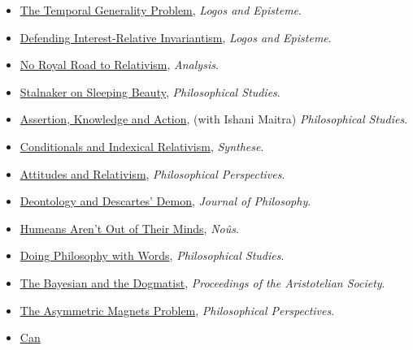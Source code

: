 \documentclass[
  10pt,
  letterpaper,
  DIV=11,
  numbers=noendperiod,
  twoside]{scrartcl}
\begin{document}
\begin{itemize}
{  and Supposition}, \emph{The Reasoner}.
\item
  \href{https://brian.weatherson.org/quarto/posts/tgp/the-temporal-generality-problem.html}{The
  Temporal Generality Problem}, \emph{Logos and Episteme}.
\item
  \href{https://brian.weatherson.org/quarto/posts/diri/defending-interest-relative-invariantism.html}{Defending
  Interest-Relative Invariantism}, \emph{Logos and Episteme}.
\item
  \href{https://brian.weatherson.org/quarto/posts/nrrtr/no-royal-road-to-relativism.html}{No
  Royal Road to Relativism}, \emph{Analysis}.
\item
  \href{https://brian.weatherson.org/quarto/posts/stalnaker-sleeping-beauity/stalnaker-on-sleeping-beauty.html}{Stalnaker
  on Sleeping Beauty}, \emph{Philosophical Studies}.
\item
  \href{https://brian.weatherson.org/quarto/posts/aka/assertion-knowledge-and-action.html}{Assertion,
  Knowledge and Action}, (with Ishani Maitra) \emph{Philosophical
  Studies}.
\item
  \href{https://brian.weatherson.org/quarto/posts/cair/conditionals-and-indexical-relativism.html}{Conditionals
  and Indexical Relativism}, \emph{Synthese}.
\item
  \href{https://brian.weatherson.org/quarto/posts/relative-attitude/attitudes-and-relativism.html}{Attitudes
  and Relativism}, \emph{Philosophical Perspectives}.
\item
  \href{https://brian.weatherson.org/quarto/posts/ddd/deontology-and-descartess-demon.html}{Deontology
  and Descartes' Demon}, \emph{Journal of Philosophy}.
\item
  \href{https://brian.weatherson.org/quarto/posts/haootm/humeans-arent-out-of-their-minds.html}{Humeans
  Aren't Out of Their Minds}, \emph{Noûs}.
\item
  \href{https://brian.weatherson.org/quarto/posts/dpww/doing-philosophy-with-words.html}{Doing
  Philosophy with Words}, \emph{Philosophical Studies}.
\item
  \href{https://brian.weatherson.org/quarto/posts/bayesdog/the-bayesian-and-the-dogmatist.html}{The
  Bayesian and the Dogmatist}, \emph{Proceedings of the Aristotelian
  Society}.
\item
  \href{https://brian.weatherson.org/quarto/posts/tamp/the-asymmetric-magnets-problem.html}{The
  Asymmetric Magnets Problem}, \emph{Philosophical Perspectives}.
\item
  \href{https://brian.weatherson.org/quarto/posts/cwpwpe/can-we-do-without-pragmatic-encroachment.html}{Can
}
\end{itemize}
\end{document}
